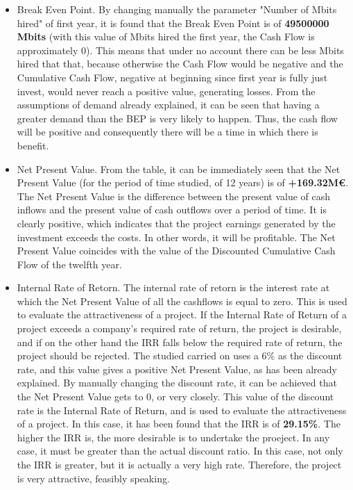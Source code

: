 \begin{itemize}
\item Break Even Point. By changing manually the parameter "Number of Mbits hired" of first year, it is found that the Break Even Point is of \textbf{49500000 Mbits} (with this value of Mbits hired the first year, the Cash Flow is approximately 0). This means that under no account there can be less Mbits hired that that, because otherwise the Cash Flow would be negative and the Cumulative Cash Flow, negative at beginning since first year is fully just invest, would never reach a positive value, generating losses. From the assumptions of demand already explained, it can be seen that having a greater demand than the BEP is very likely to happen. Thus, the cash flow will be positive and consequently there will be a time in which there is benefit.

\item Net Present Value. From the table, it can be immediately seen that the Net Present Value (for the period of time studied, of 12 years) is of \textbf{+169.32M\euro}. The Net Present Value is the difference between the present value of cash inflows and the present value of cash outflows over a period of time. It is clearly positive, which indicates that the project earnings generated by the investment exceeds the costs. In other words, it will be profitable. The Net Present Value coincides with the value of the Discounted Cumulative Cash Flow of the twelfth year. 


\item Internal Rate of Retorn. The internal rate of retorn is the interest rate at which the Net Present Value of all the cashflows is equal to zero. This is used to evaluate the attractiveness of a project. If the Internal Rate of Return of a project exceeds a company's required rate of return, the project is desirable, and if on the other hand the IRR falls below the required rate of return, the project should be rejected. The studied carried on uses a 6\% as the discount rate, and this value gives a positive Net Present Value, as has been already explained. By manually changing the discount rate, it can be achieved that the Net Present Value gets to 0, or very closely. This value of the discount rate is the Internal Rate of Return, and is used to evaluate the attractiveness of a project. In this case, it has been found that the IRR is of \textbf{29.15\%}. The higher the IRR is, the more desirable is to undertake the proeject. In any case, it must be greater than the actual discount ratio. In this case, not only the IRR is greater, but it is actually a very high rate. Therefore, the project is very attractive, feasibly speaking. 

\end{itemize}


